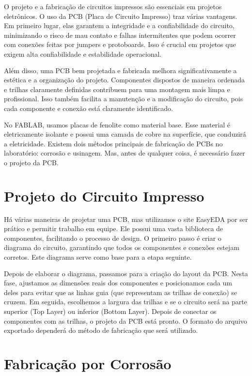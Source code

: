 \documentclass[
]{book}
\begin{document}
O projeto e a fabricação de circuitos impressos são essenciais em projetos eletrônicos. O uso da PCB (Placa de Circuito Impresso) traz várias vantagens. Em primeiro lugar, elas garantem a integridade e a confiabilidade do circuito, minimizando o risco de mau contato e falhas intermitentes que podem ocorrer com conexões feitas por jumpers e protoboards. Isso é crucial em projetos que exigem alta confiabilidade e estabilidade operacional.

Além disso, uma PCB bem projetada e fabricada melhora significativamente a estética e a organização do projeto. Componentes dispostos de maneira ordenada e trilhas claramente definidas contribuem para uma montagem mais limpa e profissional. Isso também facilita a manutenção e a modificação do circuito, pois cada componente e conexão está claramente identificado.

No FABLAB, usamos placas de fenolite como material base. Esse material é eletricamente isolante e possui uma camada de cobre na superfície, que conduzirá a eletricidade. Existem dois métodos principais de fabricação de PCBs no laboratório: corrosão e usinagem. Mas, antes de qualquer coisa, é necessário fazer o projeto da PCB.

\section{Projeto do Circuito Impresso}\label{projeto-do-circuito-impresso}

Há várias maneiras de projetar uma PCB, mas utilizamos o site EasyEDA por ser prático e permitir trabalho em equipe. Ele possui uma vasta biblioteca de componentes, facilitando o processo de design. O primeiro passo é criar o diagrama do circuito, garantindo que todos os componentes e conexões estejam corretos. Este diagrama serve como base para a etapa seguinte.

Depois de elaborar o diagrama, passamos para a criação do layout da PCB. Nesta fase, ajustamos as dimensões reais dos componentes e posicionamos cada um deles para evitar que as linhas guia (que representam as trilhas de conexão) se cruzem. Em seguida, escolhemos a largura das trilhas e se o circuito será na parte superior (Top Layer) ou inferior (Bottom Layer). Depois de conectar os componentes com as trilhas, o projeto da PCB está pronto. O formato do arquivo exportado dependerá do método de fabricação que será utilizado.

\section{Fabricação por Corrosão}\label{fabricauxe7uxe3o-por-corrosuxe3o}
\end{document}
